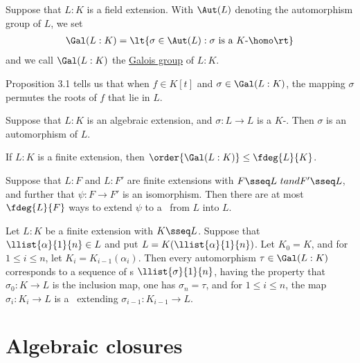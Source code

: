 \documentclass{article}
\begin{document}
  \begin{tdefinition}
    Suppose that \( L:K \) is a field extension.
    With \( \Aut(L) \) denoting the automorphism group of \( L \), we set \begin{align*}
      \Gal(L:K) = \lt\{ \sigma\in \Aut(L) : \sigma \text{ is a \( K \)-\homo} \rt\}
    \end{align*}
    and we call \( \Gal(L:K) \) the \ul{Galois group} of \( L:K \).
  \end{tdefinition}

  \quad Proposition 3.1 tells us that when \( f\in K[t] \) and \( \sigma\in \Gal(L:K) \), the mapping \( \sigma \) permutes the roots of \( f \) that lie in \( L \).

  \begin{ttheorem}
    Suppose that \( L:K \) is an algebraic extension, and \( \sigma:L\to L \) is a \( K \)-\homo.
    Then \( \sigma \) is an automorphism of \( L \).
  \end{ttheorem}

  \begin{ttheorem}
    If \( L:K \) is a finite extension, then \( \order{\Gal(L:K)}\leq \fdeg{L}{K} \).
  \end{ttheorem}

  \begin{tcorollary}
    Suppose that \( L:F \) and \( L:F' \) are finite extensions with \( F\sseq L\ tand F'\sseq L \), and further that \( \psi:F\to F' \) is an isomorphism.
    Then there are at most \( \fdeg{L}{F} \) ways to extend \( \psi \) to a \homo~from \( L \) into \( L \).
  \end{tcorollary}

  \begin{tcorollary}
    Let \( L:K \) be a finite extension with \( K\sseq L \).
    Suppose that \( \llist{\alpha}{1}{n}\in L \) and put \( L=K(\llist{\alpha}{1}{n}) \).
    Let \( K_0 = K \), and for \( 1\leq i\leq n \), let \( K_i = K_{i-1}(\alpha_i) \).
    Then every automorphism \( \tau \in \Gal(L:K) \) corresponds to a sequence of \homo s \( \llist{\sigma}{1}{n} \), having the property that \( \sigma_0:K\to L \) is the inclusion map, one has \( \sigma_n=\tau \), and for \( 1\leq i\leq n \), the map \( \sigma_i : K_i\to L \) is a \homo~extending \( \sigma_{i-1}:K_{i-1}\to L \).
  \end{tcorollary}

\section{Algebraic closures}
\end{document}

